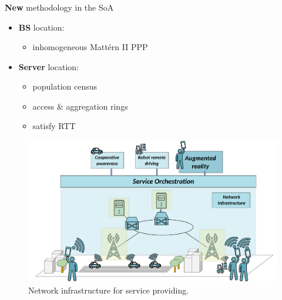 \documentclass[aspectratio=169]{beamer}
\begin{document}
\begin{frame}
    \frametitle{\secname}
    \framesubtitle{\subsecname}

    \begin{minipage}{.45\textwidth}
        {\color{red}\textbf{New}} methodology in the SoA
        \begin{itemize}
            \item \textbf{BS} location:
                \begin{itemize}
                    \item inhomogeneous Mattérn II PPP
                \end{itemize}
            \item \textbf{Server} location:
                \begin{itemize}
                    \item population census
                    \item access \& aggregation rings
                    \item satisfy RTT
                \end{itemize}
        \end{itemize}
    \end{minipage}
    \begin{minipage}{.5\textwidth}
            \begin{figure}
                \centering
                \includegraphics[width=\textwidth]{img/big-picture-infra-gen-highlight-ar.pdf}
                \caption{Network infrastructure for service providing.}
                \label{fig:big-infra}
            \end{figure}
    \end{minipage}
\end{frame}
\end{document}
